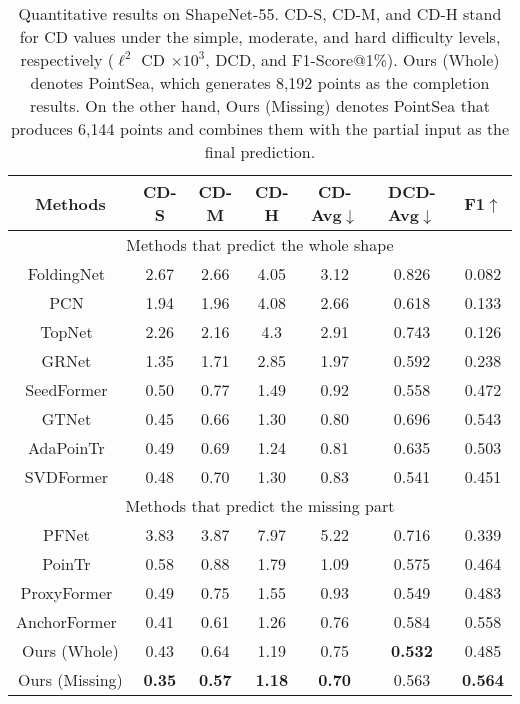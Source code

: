 \begin{table*} 
    \renewcommand\arraystretch{1.2}
    \centering
    \caption{Quantitative results on ShapeNet-55. CD-S, CD-M, and CD-H stand for CD values under the simple, moderate, and hard difficulty levels, respectively ({$\displaystyle \ell ^{2}$} CD $\times 10^3$, DCD, and F1-Score@1\%). Ours (Whole) denotes PointSea, which generates 8,192 points as the completion results. On the other hand, Ours (Missing) denotes PointSea that produces 6,144 points and combines them with the partial input as the final prediction.}
    \small
    \label{tab:shapenet55}
    \begin{tabular}{|c|ccc|ccc|}
    \hline
    Methods & CD-S & CD-M & CD-H & CD-Avg$\downarrow$ & DCD-Avg$\downarrow$ & F1$\uparrow$ \\
    \hline
              \multicolumn{7}{|c|}{Methods that predict the whole shape}\\
              \hline
              FoldingNet~\citep{yang2018foldingnet} & 2.67 & 2.66 & 4.05 & 3.12 &0.826&  0.082\\
              PCN~\citep{yuan2018pcn} & 1.94 & 1.96 & 4.08 & 2.66 & 0.618  & 0.133\\
              TopNet~\citep{tchapmi2019topnet} & 2.26 & 2.16 & 4.3 & 2.91 &0.743&0.126 \\
              GRNet~\citep{xie2020grnet}  & 1.35 & 1.71 & 2.85 & 1.97 &0.592&0.238 \\
              SeedFormer~\citep{zhou2022seedformer} & 0.50 & 0.77 & 1.49 & 0.92 &0.558& 0.472 \\
              GTNet~\citep{DBLP:journals/ijcv/ZhangLXNZTL23}  & 0.45 & 0.66 & 1.30 & 0.80 & 0.696 & 0.543 \\
              AdaPoinTr~\citep{10232862}  & 0.49 & 0.69 & 1.24 & 0.81 & 0.635 & 0.503 \\
              SVDFormer~\citep{Zhu_2023_ICCV} &  0.48 & 0.70 & 1.30 & 0.83 & 0.541 & 0.451 \\

              \hline
              \multicolumn{7}{|c|}{Methods that predict the missing part}\\
              \hline
              PFNet~\citep{huang2020pf} & 3.83 & 3.87 & 7.97 & 5.22 & 0.716 &0.339 \\
              PoinTr~\citep{yu2021pointr}  & 0.58 & 0.88 & 1.79 & 1.09 &0.575& 0.464 \\
              ProxyFormer~\citep{li2023proxyformer}  & 0.49 & 0.75 & 1.55 & 0.93 & 0.549 & 0.483 \\
              AnchorFormer~\citep{chen2023anchorformer}  & 0.41 & 0.61 & 1.26 & 0.76 & 0.584 & 0.558 \\
              
              \hline
              Ours (Whole) &  0.43 & 0.64 & 1.19 & 0.75
               & \textbf{0.532} & 0.485 \\
              Ours (Missing) &  \textbf{0.35}  & \textbf{0.57}  & \textbf{1.18}  & \textbf{0.70}  & 0.563  & \textbf{0.564} \\
              \hline
    \end{tabular}
\end{table*}

